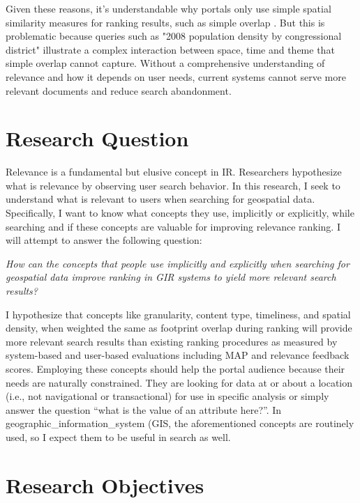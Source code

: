 Given these reasons, it’s understandable why portals only use simple spatial similarity measures for ranking results, such as simple overlap . But this is problematic because queries such as "2008 population density by congressional district" illustrate a complex interaction between space, time and theme that simple overlap cannot capture. Without a comprehensive understanding of relevance and how it depends on user needs, current systems cannot serve more relevant documents and reduce search abandonment.

\section{Research Question}

Relevance is a fundamental but elusive concept in IR. Researchers hypothesize what is relevance by observing user search behavior. In this research, I seek to understand what is relevant to users when searching for geospatial data. Specifically, I want to know what concepts they use, implicitly or explicitly, while searching and if these concepts are valuable for improving relevance ranking. I will attempt to answer the following question:
\linebreak

\emph{How can the concepts that people use implicitly and explicitly when searching for geospatial data improve ranking in GIR systems to yield more relevant search results?}
\linebreak

I hypothesize that concepts like granularity, content type, timeliness, and spatial density, when weighted the same as footprint overlap during ranking will provide more relevant search results than existing ranking procedures as measured by system-based and user-based evaluations including MAP and relevance feedback scores. Employing these concepts should help the portal audience because their needs are naturally constrained. They are looking for data at or about a location (i.e., not navigational or transactional) for use in specific analysis or simply answer the question “what is the value of an attribute here?”.  In \gls{geographic_information_system} (\acrshort{GIS}, the aforementioned concepts are routinely used, so I expect them to be useful in search as well.

\section{Research Objectives}

